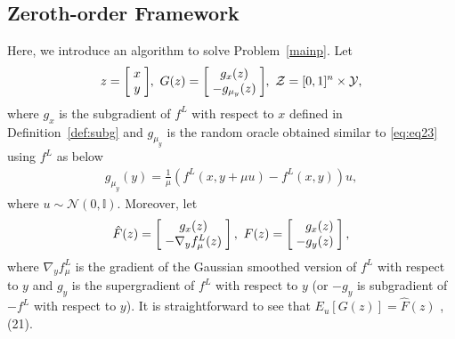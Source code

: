 \documentclass{article}
\theoremstyle{plain}
\theoremstyle{definition}
\theoremstyle{remark}
\begin{document}
\subsection{Zeroth-order Framework}
Here, we introduce an algorithm to solve 
Problem~\ref{mainp}. Let
\begin{align}
    z=\left[ \hspace{-0.075cm} \begin{array}{c}
         x  \\
         y 
    \end{array} \hspace{-0.075cm} \right]\hspace{-0.075cm},  \ 
    G(z)=\left[ \hspace{-0.075cm} \begin{array}{c}
         g_x(z)\\ 
         -g_{\mu_y}(z)
    \end{array} \hspace{-0.075cm} \right] \hspace{-0.075cm},  \
    \mathcal{Z}=[0,1]^n\times\mathcal{Y},\label{eq:G_definition}
\end{align}
where $g_x$ is the subgradient of $f^L$ with respect to $x$ defined in
Definition~\ref{def:subg} %
and $g_{\mu_y}$ is the random oracle obtained similar to \eqref{eq:eq23} using $f^L$ as below
\begin{align}\label{eq:gmu}
    g_{\mu_y}(y) = \tfrac{1}{\mu} (f^L(x,y+\mu u)-f^L(x,y)) u, %
\end{align}
where $u\sim\mathcal{N}(0,\mathbb{I}).$
Moreover, let
\begin{align}
    \hat{F}(z)=\left[ \hspace{-0.075cm} \begin{array}{c}
         g_x(z)  \\
         -\nabla_y f_\mu^L(z) 
    \end{array} \hspace{-0.075cm} \right],  \ 
    F(z)=\left[ \hspace{-0.075cm} \begin{array}{r}
         g_x(z)\\ 
         -g_{y}(z)
    \end{array} \hspace{-0.075cm} \right], \label{eq:F_definition}
\end{align}
where $\nabla_y f_\mu^L$ is the gradient of the Gaussian smoothed version of $f^L$  with respect to $y$ and $g_{y}$ is the supergradient of $f^L$ with respect to $y$ (or $-g_{y}$ is subgradient of $-f^L$ with respect to $y$). 
It is straightforward to see that $E_u[G(z)]=\hat{F}(z)$ \cite{nesterov_random_2017}, (21).
\end{document}
